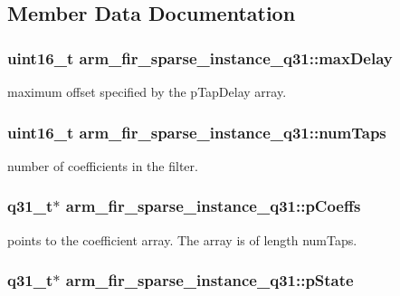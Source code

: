 \subsection{Member Data Documentation}
\hypertarget{structarm__fir__sparse__instance__q31_afdd3a1dc72132c854dc379154b68b674}{
\subsubsection[{max\-Delay}]{\setlength{\rightskip}{0pt plus 5cm}uint16\-\_\-t arm\-\_\-fir\-\_\-sparse\-\_\-instance\-\_\-q31\-::max\-Delay}}\label{structarm__fir__sparse__instance__q31_afdd3a1dc72132c854dc379154b68b674}
maximum offset specified by the p\-Tap\-Delay array. \hypertarget{structarm__fir__sparse__instance__q31_a07b6c01e58ec6dde384719130d36b0dc}{
\subsubsection[{num\-Taps}]{\setlength{\rightskip}{0pt plus 5cm}uint16\-\_\-t arm\-\_\-fir\-\_\-sparse\-\_\-instance\-\_\-q31\-::num\-Taps}}\label{structarm__fir__sparse__instance__q31_a07b6c01e58ec6dde384719130d36b0dc}
number of coefficients in the filter. \hypertarget{structarm__fir__sparse__instance__q31_a093d6227f0d1597982cd083fb126f4e0}{
\subsubsection[{p\-Coeffs}]{\setlength{\rightskip}{0pt plus 5cm}q31\-\_\-t$\ast$ arm\-\_\-fir\-\_\-sparse\-\_\-instance\-\_\-q31\-::p\-Coeffs}}\label{structarm__fir__sparse__instance__q31_a093d6227f0d1597982cd083fb126f4e0}
points to the coefficient array. The array is of length num\-Taps. \hypertarget{structarm__fir__sparse__instance__q31_a830be89daa5a393b225048889aa045d1}{
\subsubsection[{p\-State}]{\setlength{\rightskip}{0pt plus 5cm}q31\-\_\-t$\ast$ arm\-\_\-fir\-\_\-sparse\-\_\-instance\-\_\-q31\-::p\-State}}\label{structarm__fir__sparse__instance__q31_a830be89daa5a393b225048889aa045d1}
